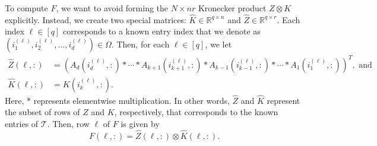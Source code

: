 \documentclass{article}
\DeclareMathOperator{\vecop}{vec}
\theoremstyle{plain} %
\begin{document}
To compute $F$, we want to avoid forming the $N \times nr$ Kronecker product 
$Z \otimes K$ explicitly.
Instead, we create two special matrices:
$\hat{K} \in \mathbb{R}^{q \times n}$ and $\hat{Z} \in \mathbb{R}^{q \times r}$.
Each index $\ell \in [q]$ corresponds to a known entry index that we 
denote as $(i_1^{(\ell)}, i_2^{(\ell)}, \dots, i_d^{(\ell)}) \in \Omega$.
Then, for each $\ell \in [q]$, we let
\begin{align}
    \label{eq:zhat} 
    \hat{Z}(\ell,:) & = \left(
        A_{d}(i_d^{(\ell)},:) \ast \cdots \ast A_{k+1}(i_{k+1}^{(\ell)},:) \ast
        A_{k-1}(i_{k-1}^{(\ell)},:) \ast \cdots \ast A_{1}(i_1^{(\ell)},:)
	\right)^T, 
    \text{ and}
    \\
    \label{eq:khat} 
    \hat{K}(\ell,:) & = K(i_k^{(\ell)},:)  .
\end{align}
Here, $\ast$ represents elementwise multiplication.
In other words, $\hat{Z}$ and $\hat{K}$ 
represent the subset of rows of $Z$ and $K$, respectively,
that corresponds to the known entries of $\mathcal{T}$.
Then, row $\ell$ of $F$ is given by
\begin{equation}
    F(\ell,:) = \hat{Z}(\ell,:) \otimes \hat{K}(\ell,:).
\end{equation}





\end{document}
